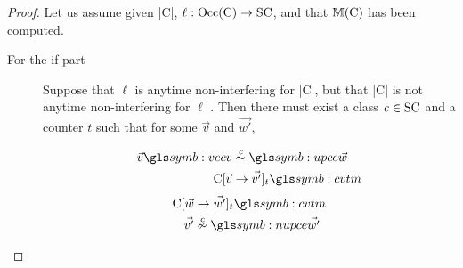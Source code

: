 \corrthm*

\begin{proof}
Let us assume given \prc|C|, \(\ell : \Occ(\prc|C|) \to
\SC\), and that $\sfm{\prc|C|}$ has been
computed.

\begin{description}
\item[For the if part]

Suppose that \(\ell\) is anytime
non-interfering for \prc|C|, but that
\prc|C| is not anytime non-interfering for \(\ell\) . Then there
must exist a class \(\mathit{c} \in \mathrm{SC}\) and a counter
\(t\) such that for some \(\vec{v}\) and \(\vec{w'}\),
\begin{multicols}{2}
\noindent%
\begin{align}
\vec{v}\symbo{vecv} & \upce{\scl{c}}\symbo{upce} \vec{w} \label{eq:equi-level}\\
\prc|C|[\vec{v} &\rightarrow \vec{v'}]_t\symbo{cvtm}
\end{align}%
\begin{align}
\prc|C|[\vec{w} &\rightarrow \vec{w'}]_t\symbo{cvtm} \\
\vec{v'} &\nupce{\scl{c}}\symbo{nupce} \vec{w'}
\end{align}
\end{multicols}


\end{description}
\end{proof}
